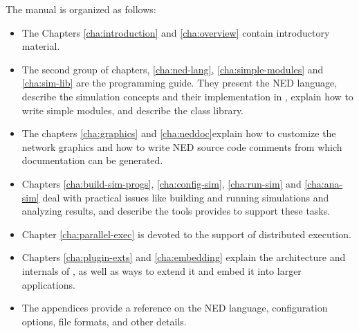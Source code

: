 The manual is organized as follows:

\begin{itemize}
  \item The Chapters \ref{cha:introduction} and \ref{cha:overview}
    contain introductory material.
  \item The second group of chapters, \ref{cha:ned-lang}, \ref{cha:simple-modules} and
    \ref{cha:sim-lib} are the programming guide. They present the
    NED language, describe the simulation concepts
    and their implementation in {\opp}, explain how to write
    simple modules, and describe the class library.
  \item The chapters \ref{cha:graphics} and \ref{cha:neddoc}explain how to customize
    the network graphics and how to write NED source code comments
    from which documentation can be generated.
  \item Chapters \ref{cha:build-sim-progs},
    \ref{cha:config-sim}, \ref{cha:run-sim} and \ref{cha:ana-sim} deal with
    practical issues like building and running simulations and analyzing results, and
    describe the tools {\opp} provides to support these tasks.
  \item Chapter \ref{cha:parallel-exec} is devoted to the support
    of distributed execution.
  \item Chapters \ref{cha:plugin-exts} and \ref{cha:embedding}
    explain the architecture and internals of {\opp}, as well as
    ways to extend it and embed it into larger applications.
  \item The appendices provide a reference on the NED language,
    configuration options, file formats, and other details.
\end{itemize}


%
%


